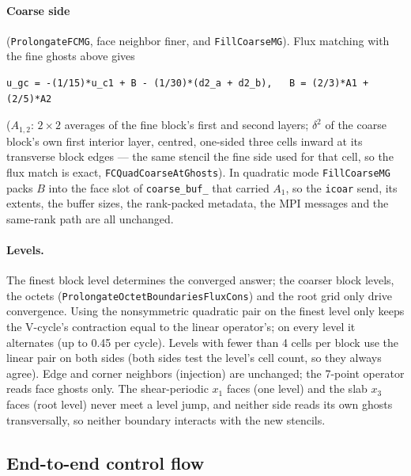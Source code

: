 \documentclass[11pt]{article}
\newcommand{\code}[1]{\texttt{#1}}
\newcommand{\fn}[1]{\texttt{\small #1}}
\begin{document}
\paragraph{Coarse side} (\fn{ProlongateFCMG}, face neighbor finer, and \fn{FillCoarseMG}).
Flux matching with the fine ghosts above gives
\begin{verbatim}
u_gc = -(1/15)*u_c1 + B - (1/30)*(d2_a + d2_b),   B = (2/3)*A1 + (2/5)*A2
\end{verbatim}
($A_{1,2}$: $2\times2$ averages of the fine block's first and second layers; $\delta^2$ of the coarse
block's own first interior layer, centred, one-sided three cells inward at its transverse block
edges --- the same stencil the fine side used for that cell, so the flux match is exact,
\fn{FCQuadCoarseAtGhosts}). In quadratic mode \fn{FillCoarseMG} packs $B$ into the face slot of
\code{coarse\_buf\_} that carried $A_1$, so the \code{icoar} send, its extents, the buffer sizes,
the rank-packed metadata, the MPI messages and the same-rank path are all unchanged.

\paragraph{Levels.} The finest block level determines the converged answer; the coarser block
levels, the octets (\fn{ProlongateOctetBoundariesFluxCons}) and the root grid only drive
convergence. Using the nonsymmetric quadratic pair on the finest level only keeps the V-cycle's
contraction equal to the linear operator's; on every level it alternates (up to 0.45 per cycle).
Levels with fewer than 4 cells per block use the linear pair on both sides (both sides test the
level's cell count, so they always agree). Edge and corner neighbors (injection) are unchanged;
the 7-point operator reads face ghosts only. The shear-periodic $x_1$ faces (one level) and the
slab $x_3$ faces (root level) never meet a level jump, and neither side reads its own ghosts
transversally, so neither boundary interacts with the new stencils.

\subsection{End-to-end control flow}
\end{document}
